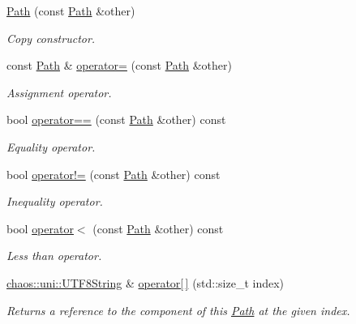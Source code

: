 \begin{DoxyCompactItemize}
\hyperlink{classchaos_1_1io_1_1sys_1_1_path_a40b3bf651b667adbd3eeb1ee55564211}{Path} (const \hyperlink{classchaos_1_1io_1_1sys_1_1_path}{Path} \&other)
\begin{DoxyCompactList}\small\item\em Copy constructor. \end{DoxyCompactList}\item 
const \hyperlink{classchaos_1_1io_1_1sys_1_1_path}{Path} \& \hyperlink{classchaos_1_1io_1_1sys_1_1_path_a45c70fc34ff619e890d5bc807dd70d8b}{operator=} (const \hyperlink{classchaos_1_1io_1_1sys_1_1_path}{Path} \&other)
\begin{DoxyCompactList}\small\item\em Assignment operator. \end{DoxyCompactList}\item 
bool \hyperlink{classchaos_1_1io_1_1sys_1_1_path_ac2e63307a0526625f4447f1d2a704e3b}{operator==} (const \hyperlink{classchaos_1_1io_1_1sys_1_1_path}{Path} \&other) const 
\begin{DoxyCompactList}\small\item\em Equality operator. \end{DoxyCompactList}\item 
bool \hyperlink{classchaos_1_1io_1_1sys_1_1_path_acd6dea0a797c0307179a5523239a299a}{operator!=} (const \hyperlink{classchaos_1_1io_1_1sys_1_1_path}{Path} \&other) const 
\begin{DoxyCompactList}\small\item\em Inequality operator. \end{DoxyCompactList}\item 
bool \hyperlink{classchaos_1_1io_1_1sys_1_1_path_a90858bbce348d5b36d0c31d771c601d8}{operator$<$} (const \hyperlink{classchaos_1_1io_1_1sys_1_1_path}{Path} \&other) const 
\begin{DoxyCompactList}\small\item\em Less than operator. \end{DoxyCompactList}\item 
\hyperlink{classchaos_1_1uni_1_1_u_t_f8_string}{chaos\-::uni\-::\-U\-T\-F8\-String} \& \hyperlink{classchaos_1_1io_1_1sys_1_1_path_af04cdedb77f8b81825dea5e830f8d28f}{operator\mbox{[}$\,$\mbox{]}} (std\-::size\-\_\-t index)
\begin{DoxyCompactList}\small\item\em Returns a reference to the component of this \hyperlink{classchaos_1_1io_1_1sys_1_1_path}{Path} at the given index. \end{DoxyCompactList}\item 

\end{DoxyCompactItemize}
